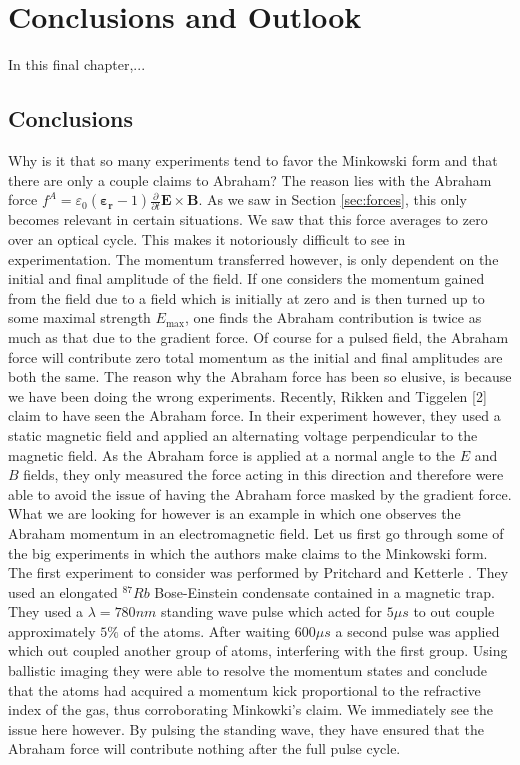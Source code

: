 \chapter{Conclusions and Outlook}


In this final chapter,...


\section{Conclusions}
Why is it that so many experiments tend to favor the Minkowski form and that there are only a couple claims to Abraham? The reason lies with the Abraham force $f^A=\varepsilon_0\left(\mathbf{\varepsilon_r}-1\right)\frac{\partial}{\partial t}\mathbf{E}\times\mathbf{B}$. As we saw in Section \ref{sec:forces}, this only becomes relevant in certain situations.  We saw that this force averages to zero over an optical cycle. This makes it notoriously difficult to see in experimentation. The momentum transferred however, is only dependent on the initial and final amplitude of the field.  If one considers the momentum gained from the field due to a field which is initially at zero and is then turned up to some maximal strength $E_{\mathrm{max}}$, one finds the Abraham contribution is twice as much as that due to the gradient force.  Of course for a pulsed field, the Abraham force will contribute zero total momentum as the initial and final amplitudes are both the same.  The reason why the Abraham force has been so elusive, is because we have been doing the wrong experiments. Recently, Rikken and Tiggelen [2] claim to have seen the Abraham force.  In their experiment however, they used a static magnetic field and applied an alternating voltage perpendicular to the magnetic field.  As the Abraham force is applied at a normal angle to the $E$ and $B$ fields, they only measured the force acting in this direction and therefore were able to avoid the issue of having the Abraham force masked by the gradient force.  What we are looking for however is an example in which one observes the Abraham momentum in an electromagnetic field.  Let us first go through some of the big experiments in which the authors make claims to the Minkowski form.
\\
The first experiment to consider was performed by Pritchard and Ketterle \cite{ketterle}.  They used an elongated $^{87}Rb$ Bose-Einstein condensate contained in a magnetic trap.  They used a $\lambda=780 nm$ standing wave pulse which acted for $5 \mu s$ to out couple approximately $5\%$ of the atoms.  After waiting $600 \mu s$ a second pulse was applied which out coupled another group of atoms, interfering with the first group.  Using ballistic imaging they were able to resolve the momentum states and conclude that the atoms had acquired a momentum kick proportional to the refractive index of the gas, thus corroborating Minkowki's claim.  We immediately see the issue here however.  By pulsing the standing wave, they have ensured that the Abraham force will contribute nothing after the full pulse cycle.  

